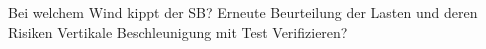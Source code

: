 Bei welchem Wind kippt der SB?
Erneute Beurteilung der Lasten und deren Risiken
Vertikale Beschleunigung mit Test Verifizieren?
